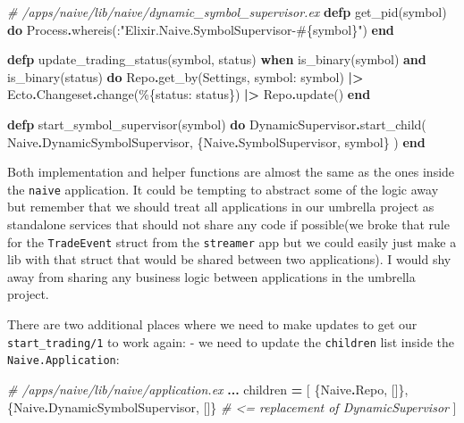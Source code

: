 \documentclass[
]{book}
\newenvironment{Shaded}{\begin{snugshade}}{\end{snugshade}}
\newcommand{\CommentTok}[1]{\textcolor[rgb]{0.56,0.35,0.01}{\textit{#1}}}
\newcommand{\ConstantTok}[1]{\textcolor[rgb]{0.00,0.00,0.00}{#1}}
\newcommand{\KeywordTok}[1]{\textcolor[rgb]{0.13,0.29,0.53}{\textbf{#1}}}
\newcommand{\NormalTok}[1]{#1}
\newcommand{\OperatorTok}[1]{\textcolor[rgb]{0.81,0.36,0.00}{\textbf{#1}}}
\newcommand{\OtherTok}[1]{\textcolor[rgb]{0.56,0.35,0.01}{#1}}
\newcommand{\StringTok}[1]{\textcolor[rgb]{0.31,0.60,0.02}{#1}}
\newcommand{\VariableTok}[1]{\textcolor[rgb]{0.00,0.00,0.00}{#1}}
\begin{document}
\begin{Shaded}
\begin{Highlighting}[]
\CommentTok{\# /apps/naive/lib/naive/dynamic\_symbol\_supervisor.ex}
  \KeywordTok{defp}\NormalTok{ get\_pid(symbol) }\KeywordTok{do}
    \ConstantTok{Process}\OperatorTok{.}\NormalTok{whereis(:}\StringTok{"Elixir.Naive.SymbolSupervisor{-}}\OtherTok{\#\{}\NormalTok{symbol}\OtherTok{\}}\StringTok{"}\NormalTok{)}
  \KeywordTok{end}

  \KeywordTok{defp}\NormalTok{ update\_trading\_status(symbol, status)}
       \KeywordTok{when}\NormalTok{ is\_binary(symbol) }\KeywordTok{and}\NormalTok{ is\_binary(status) }\KeywordTok{do}
    \ConstantTok{Repo}\OperatorTok{.}\NormalTok{get\_by(}\ConstantTok{Settings}\NormalTok{, }\VariableTok{symbol:}\NormalTok{ symbol)}
    \OperatorTok{|\textgreater{}} \ConstantTok{Ecto}\OperatorTok{.}\ConstantTok{Changeset}\OperatorTok{.}\NormalTok{change(\%\{}\VariableTok{status:}\NormalTok{ status\})}
    \OperatorTok{|\textgreater{}} \ConstantTok{Repo}\OperatorTok{.}\NormalTok{update()}
  \KeywordTok{end}

  \KeywordTok{defp}\NormalTok{ start\_symbol\_supervisor(symbol) }\KeywordTok{do}
    \ConstantTok{DynamicSupervisor}\OperatorTok{.}\NormalTok{start\_child(}
      \ConstantTok{Naive}\OperatorTok{.}\ConstantTok{DynamicSymbolSupervisor}\NormalTok{,}
\NormalTok{      \{}\ConstantTok{Naive}\OperatorTok{.}\ConstantTok{SymbolSupervisor}\NormalTok{, symbol\}}
\NormalTok{    )}
  \KeywordTok{end}
\end{Highlighting}
\end{Shaded}

Both implementation and helper functions are almost the same as the ones inside the \texttt{naive} application. It could be tempting to abstract some of the logic away but remember that we should treat all applications in our umbrella project as standalone services that should not share any code if possible(we broke that rule for the \texttt{TradeEvent} struct from the \texttt{streamer} app but we could easily just make a lib with that struct that would be shared between two applications). I would shy away from sharing any business logic between applications in the umbrella project.

There are two additional places where we need to make updates to get our \texttt{start\_trading/1} to work again:
- we need to update the \texttt{children} list inside the \texttt{Naive.Application}:

\begin{Shaded}
\begin{Highlighting}[]
\CommentTok{\# /apps/naive/lib/naive/application.ex}
    \OperatorTok{...}
\NormalTok{    children }\OperatorTok{=}\NormalTok{ [}
\NormalTok{      \{}\ConstantTok{Naive}\OperatorTok{.}\ConstantTok{Repo}\NormalTok{, []\},}
\NormalTok{      \{}\ConstantTok{Naive}\OperatorTok{.}\ConstantTok{DynamicSymbolSupervisor}\NormalTok{, []\} }\CommentTok{\# \textless{}= replacement of DynamicSupervisor}
\NormalTok{    ]}
\end{Highlighting}
\end{Shaded}
\end{document}
